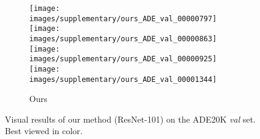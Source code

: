 \documentclass[10pt,twocolumn,letterpaper]{article}
\begin{document}
\begin{figure*}[!htb]
\begin{center}
\begin{subfigure}[b]{0.24\linewidth}
		\texttt{[image: images/supplementary/ours\_ADE\_val\_00000797]}\\
		\texttt{[image: images/supplementary/ours\_ADE\_val\_00000863]}\\
		\texttt{[image: images/supplementary/ours\_ADE\_val\_00000925]}\\
		\texttt{[image: images/supplementary/ours\_ADE\_val\_00001344]}\\
		\caption{Ours}
    \end{subfigure}
\end{center}
	\caption{Visual results of our method (ResNet-101) on the ADE20K \textit{val} set. Best viewed in color.}
	\label{img:visual_last}
\end{figure*}
\end{document}
